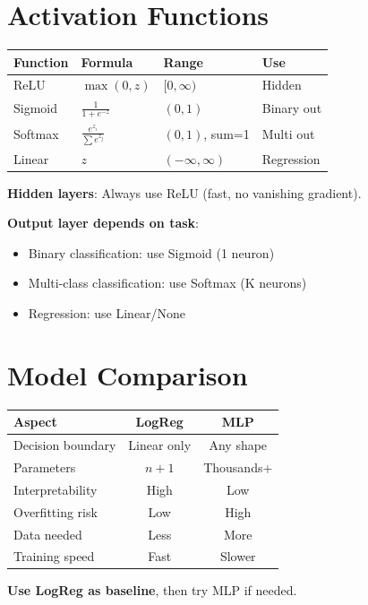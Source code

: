 \documentclass[11pt,a4paper]{article}
\begin{document}
\section{Activation Functions}

\begin{definitionbox}

\begin{tabular}{@{}l|l|l|l@{}}
\textbf{Function} & \textbf{Formula} & \textbf{Range} & \textbf{Use} \\
\hline
ReLU & $\max(0,z)$ & $[0,\infty)$ & Hidden \\
Sigmoid & $\frac{1}{1+e^{-z}}$ & $(0,1)$ & Binary out \\
Softmax & $\frac{e^{z_i}}{\sum e^{z_j}}$ & $(0,1)$, sum=1 & Multi out \\
Linear & $z$ & $(-\infty,\infty)$ & Regression \\
\end{tabular}
\end{definitionbox}

\begin{notebox}

\textbf{Hidden layers}: Always use ReLU (fast, no vanishing gradient).

\textbf{Output layer depends on task}:
\begin{itemize}[leftmargin=*,nosep]
\item Binary classification: use Sigmoid (1 neuron)
\item Multi-class classification: use Softmax (K neurons)
\item Regression: use Linear/None
\end{itemize}
\end{notebox}

\section{Model Comparison}

\begin{definitionbox}

\begin{tabular}{@{}l|cc@{}}
\textbf{Aspect} & \textbf{LogReg} & \textbf{MLP} \\
\hline
Decision boundary & Linear only & Any shape \\
Parameters & $n+1$ & Thousands+ \\
Interpretability & High & Low \\
Overfitting risk & Low & High \\
Data needed & Less & More \\
Training speed & Fast & Slower \\
\end{tabular}

\textbf{Use LogReg as baseline}, then try MLP if needed.
\end{definitionbox}
\end{document}

